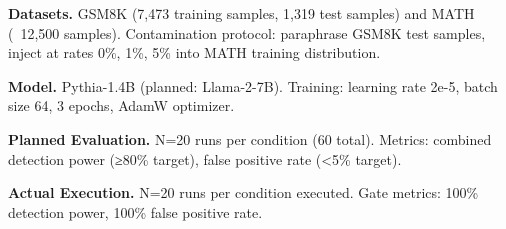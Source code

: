 
\textbf{Datasets.} GSM8K (7,473 training samples, 1,319 test samples) and MATH (~12,500 samples). Contamination protocol: paraphrase GSM8K test samples, inject at rates {0\%, 1\%, 5\%} into MATH training distribution.

\textbf{Model.} Pythia-1.4B (planned: Llama-2-7B). Training: learning rate 2e-5, batch size 64, 3 epochs, AdamW optimizer.

\textbf{Planned Evaluation.} N=20 runs per condition (60 total). Metrics: combined detection power (≥80\% target), false positive rate (<5\% target).

\textbf{Actual Execution.} N=20 runs per condition executed. Gate metrics: 100\% detection power, 100\% false positive rate.
